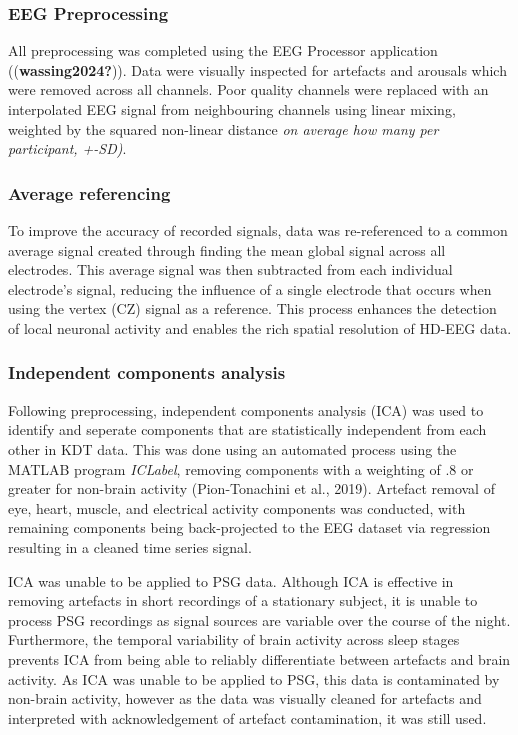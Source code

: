 \documentclass[
]{article}
\begin{document}
\subsubsection{EEG Preprocessing}\label{eeg-preprocessing}

All preprocessing was completed using the EEG Processor application
((\textbf{wassing2024?})). Data were visually inspected for artefacts
and arousals which were removed across all channels. Poor quality
channels were replaced with an interpolated EEG signal from neighbouring
channels using linear mixing, weighted by the squared non-linear
distance \emph{on average how many per participant, +-SD)}.

\subsubsection{Average referencing}\label{average-referencing}

To improve the accuracy of recorded signals, data was re-referenced to a
common average signal created through finding the mean global signal
across all electrodes. This average signal was then subtracted from each
individual electrode's signal, reducing the influence of a single
electrode that occurs when using the vertex (CZ) signal as a reference.
This process enhances the detection of local neuronal activity and
enables the rich spatial resolution of HD-EEG data.

\subsubsection{Independent components
analysis}\label{independent-components-analysis}

Following preprocessing, independent components analysis (ICA) was used
to identify and seperate components that are statistically independent
from each other in KDT data. This was done using an automated process
using the MATLAB program \emph{ICLabel}, removing components with a
weighting of .8 or greater for non-brain activity (Pion-Tonachini et
al., 2019). Artefact removal of eye, heart, muscle, and electrical
activity components was conducted, with remaining components being
back-projected to the EEG dataset via regression resulting in a cleaned
time series signal.

ICA was unable to be applied to PSG data. Although ICA is effective in
removing artefacts in short recordings of a stationary subject, it is
unable to process PSG recordings as signal sources are variable over the
course of the night. Furthermore, the temporal variability of brain
activity across sleep stages prevents ICA from being able to reliably
differentiate between artefacts and brain activity. As ICA was unable to
be applied to PSG, this data is contaminated by non-brain activity,
however as the data was visually cleaned for artefacts and interpreted
with acknowledgement of artefact contamination, it was still used.
\end{document}
